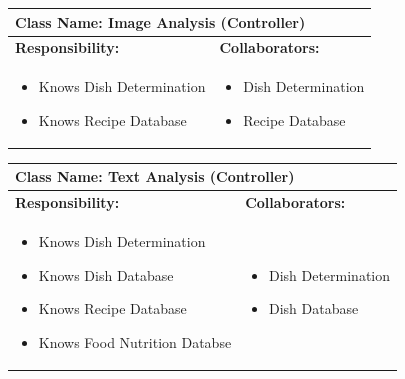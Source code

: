 \documentclass[]{article}
\begin{document}
\begin{table}[H]
	\centering
	\begin{tabular}{|p{7cm}|p{7cm}|}
	\hline 
	 \multicolumn{2}{|l|}{\textbf{Class Name:} Image Analysis (Controller) }\\
	\hline
	\textbf{Responsibility:} & \textbf{Collaborators:} \\
	\hline
	\raggedright
	\begin{itemize}
		\item Knows Dish Determination
		\item Knows Recipe Database
	\end{itemize}
	\vspace{1in} & 
	\begin{itemize}
		\item Dish Determination 
		\item Recipe Database
	\end{itemize} \\
	\hline
	\end{tabular}
\end{table}

\begin{table}[H]
	\centering
	\begin{tabular}{|p{7cm}|p{7cm}|}
	\hline 
	 \multicolumn{2}{|l|}{\textbf{Class Name:} Text Analysis (Controller) }\\
	\hline
	\textbf{Responsibility:} & \textbf{Collaborators:} \\
	\hline
	\raggedright
	\begin{itemize}
		\item Knows Dish Determination
		\item Knows Dish Database
		\item Knows Recipe Database
		\item Knows Food Nutrition Databse
	\end{itemize}
	\vspace{1in} & 
	\begin{itemize}
		\item Dish Determination 
		\item Dish Database
	\end{itemize} \\
	\hline
	\end{tabular}
\end{table}

\end{document}
